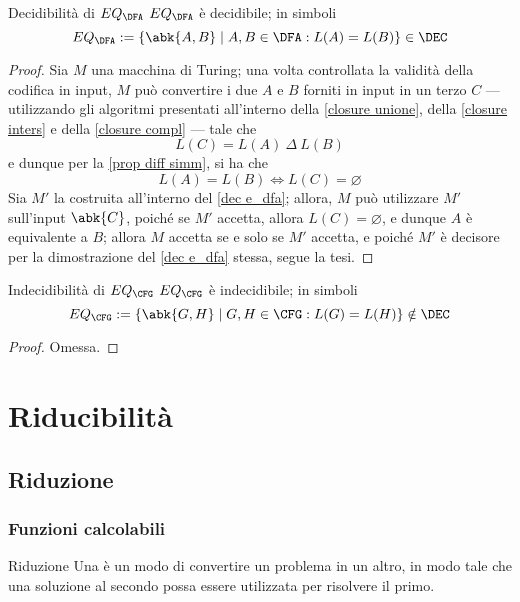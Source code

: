 \documentclass[a4paper, 12pt]{report}
\begin{document}
    \begin{framedthm}{Decidibilità di $EQ_\DFA$}
        $EQ_\DFA$ è decidibile; in simboli $$EQ_\DFA := \{\abk{A, B} \mid A, B \in \DFA : L(A) = L(B) \} \in \DEC$$
    \end{framedthm}

    \begin{proof}
        Sia $M$ una macchina di Turing; una volta controllata la validità della codifica in input, $M$ può convertire i due \DFA $A$ e $B$ forniti in input in un terzo \DFA $C$ --- utilizzando gli algoritmi presentati all'interno della \cref{closure unione}, della \cref{closure inters} e della \cref{closure compl} --- tale che $$L(C) = L(A) \ \Delta \ L(B)$$ e dunque per la \cref{prop diff simm}, si ha che $$L(A) = L(B) \iff L(C) = \varnothing$$ Sia $M'$ la \TM costruita all'interno del \cref{dec e_dfa}; allora, $M$ può utilizzare $M'$ sull'input $\abk{C}$, poiché se $M'$ accetta, allora $L(C) = \varnothing$, e dunque $A$ è equivalente a $B$; allora $M$ accetta se e solo se $M'$ accetta, e poiché $M'$ è decisore per la dimostrazione del \cref{dec e_dfa} stessa, segue la tesi.
    \end{proof}

    \begin{framedthm}{Indecidibilità di $EQ_\CFG$}
        $EQ_\CFG$ è indecidibile; in simboli $$EQ_\CFG := \{\abk{G,H} \mid G,H \in \CFG : L(G) = L(H)\} \notin \DEC$$
    \end{framedthm}

    \begin{proof}
        Omessa.
    \end{proof}

    \chapter{Riducibilità}

    \section{Riduzione}

    \subsection{Funzioni calcolabili}

    \begin{frameddefn}{Riduzione}
        Una  è un modo di convertire un problema in un altro, in modo tale che una soluzione al secondo possa essere utilizzata per risolvere il primo.
    \end{frameddefn}
\end{document}
